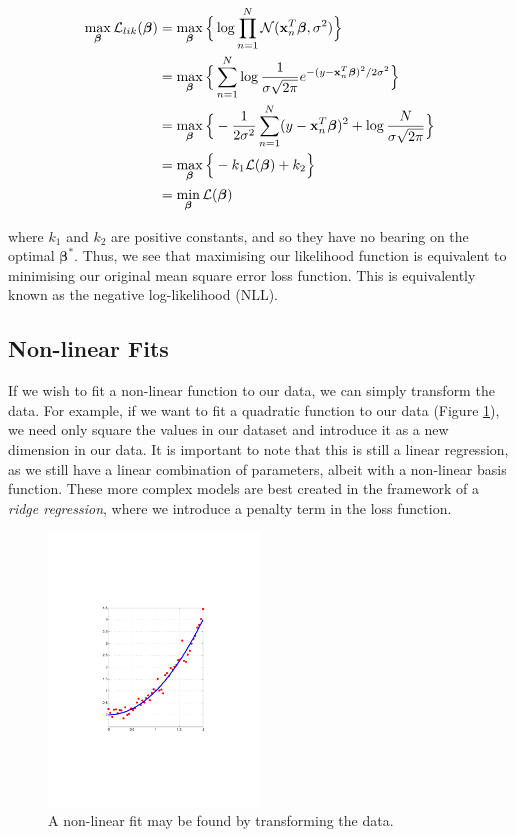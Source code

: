 \documentclass[11pt]{amsart}
\begin{document}
\begin{align}
\max_{\boldsymbol\beta}\mathcal{L}_{lik}(\boldsymbol\beta) &= \max_{\boldsymbol\beta}\Big\{\log \prod_{n=1}^N \mathcal{N}(\mathbf{x}_n^T\boldsymbol\beta, \sigma^2)\Big\} \notag \\
&=\max_{\boldsymbol\beta}\Big\{\sum_{n=1}^N \log \frac{1}{\sigma\sqrt{2\pi}}e^{-(y - \mathbf{x}_n^T\boldsymbol\beta)^2/2\sigma^2}\Big\} \notag \\
&=\max_{\boldsymbol\beta}\Big\{-\frac{1}{2\sigma^2}\sum_{n=1}^N (y - \mathbf{x}_n^T\boldsymbol\beta)^2 + \log\frac{N}{\sigma\sqrt{2\pi}}\Big\} \notag \\
&=\max_{\boldsymbol\beta}\Big\{-k_1\mathcal{L}(\boldsymbol\beta) + k_2\Big\} \notag \\
&=\min_{\boldsymbol\beta}\mathcal{L}(\boldsymbol\beta)\notag
\end{align}

where $k_1$ and $k_2$ are positive constants, and so they have no bearing on the optimal $\boldsymbol\beta^*$. Thus, we see that maximising our likelihood function is equivalent to minimising our original mean square error loss function. This is equivalently known as the negative log-likelihood (NLL).

\subsection{Non-linear Fits}

If we wish to fit a non-linear function to our data, we can simply transform the data. For example, if we want to fit a quadratic function to our data (Figure \ref{fig:quadraticfit}), we need only square the values in our dataset and introduce it as a new dimension in our data. It is important to note that this is still a linear regression, as we still have a linear combination of parameters, albeit with a non-linear basis function. These more complex models are best created in the framework of a \emph{ridge regression}, where we introduce a penalty term in the loss function.

\begin{figure}[!ht]
\centering
\includegraphics[width=0.5\textwidth]{Figures/quadraticfit.pdf}
\caption{A non-linear fit may be found by transforming the data.}
\label{fig:quadraticfit}
\end{figure}
\end{document}

